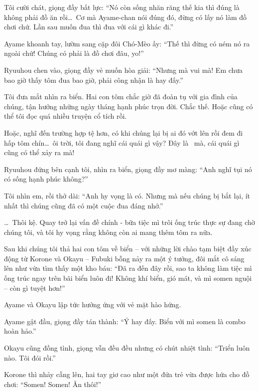 \documentclass[../main.tex]{subfiles}
\begin{document}

Tôi cười chát, giọng đầy bất lực: ``Nó còn sống nhăn răng thế kia thì đúng là không phải đồ ăn rồi\dots\ Cơ mà Ayame-chan nói đúng đó, đừng có lấy nó làm đồ chơi chứ. Lần sau muốn đua thì đua với cái gì khác đi.''

Ayame khoanh tay, lườm sang cặp đôi Chó-Mèo ấy: ``Thế thì đừng có ném nó ra ngoài chứ! Chúng có phải là đồ chơi đâu, yo!''

Ryuuhou chen vào, giọng đầy vẻ muốn hòa giải: ``Nhưng mà vui mà! Em chưa bao giờ thấy tôm đua bao giờ, phải công nhận là hay đấy.''

Tôi đưa mắt nhìn ra biển. Hai con tôm chắc giờ đã đoàn tụ với gia đình của chúng, tận hưởng những ngày tháng hạnh phúc trọn đời. Chắc thế. Hoặc cũng có thể tôi đọc quá nhiều truyện cổ tích rồi.


Hoặc, nghĩ đến trường hợp tệ hơn, có khi chúng lại bị ai đó vớt lên rồi đem đi hấp tôm chín\dots\ ôi trời, tôi đang nghĩ cái quái gì vậy? Đây là \hll\ mà, cái quái gì cũng có thể xảy ra mà!

Ryuuhou đứng bên cạnh tôi, nhìn ra biển, giọng đầy mơ màng: ``Anh nghĩ tụi nó có sống hạnh phúc không?''

Tôi nhìn em, rồi thở dài: ``Anh hy vọng là có. Nhưng mà nếu chúng bị bắt lại, ít nhất thì chúng cũng đã có một cuộc đua đáng nhớ.''

\dots\ Thôi kệ. Quay trở lại vấn đề chính - bữa tiệc mì trôi ống trúc thực sự đang chờ chúng tôi, và tôi hy vọng rằng không còn ai mang thêm tôm ra nữa.

\ct

Sau khi chúng tôi thả hai con tôm về biển – với những lời chào tạm biệt đầy xúc động từ Korone và Okayu – Fubuki bỗng nảy ra một ý tưởng, đôi mắt cô sáng lên như vừa tìm thấy một kho báu: ``Đã ra đến đây rồi, sao ta không làm tiệc mì ống trúc ngay trên bãi biển luôn đi! Không khí biển, gió mát, và mì somen nguội – còn gì tuyệt hơn!''

Ayame và Okayu lập tức hưởng ứng với vẻ mặt hào hứng.

Ayame gật đầu, giọng đầy tán thành: ``Ý hay đấy. Biển với mì somen là combo hoàn hảo.''

Okayu cũng đồng tình, giọng vẫn đều đều nhưng có chút nhiệt tình: ``Triển luôn nào. Tôi đói rồi.''

Korone thì nhảy cẫng lên, hai tay giơ cao như một đứa trẻ vừa được hứa cho đồ chơi: ``Somen! Somen! Ăn thôi!''
\end{document}
